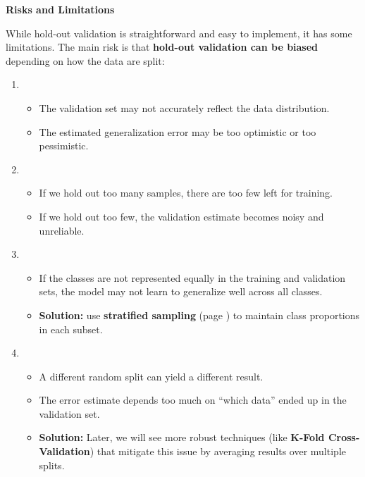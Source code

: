 \newpage

\begin{flushleft}
    \textcolor{Red2}{ \textbf{Risks and Limitations}}
\end{flushleft}
While hold-out validation is straightforward and easy to implement, it has some limitations. The main risk is that \textbf{hold-out validation can be biased} depending on how the data are split:
\begin{enumerate}
    \item {}
    \begin{itemize}
        \item The validation set may not accurately reflect the data distribution.
        \item The estimated generalization error may be too optimistic or too pessimistic.
    \end{itemize}

    \item {}
    \begin{itemize}
        \item If we hold out too many samples, there are too few left for training.
        \item If we hold out too few, the validation estimate becomes noisy and unreliable.
    \end{itemize}

    \item {}
    \begin{itemize}
        \item If the classes are not represented equally in the training and validation sets, the model may not learn to generalize well across all classes.
        \item[\textcolor{Green3}{\faIcon{check}}] \textcolor{Green3}{\textbf{Solution:}} use \textbf{stratified sampling} (page \pageref{def:stratified-sampling}) to maintain class proportions in each subset.
    \end{itemize}

    \item {}
    \begin{itemize}
        \item A different random split can yield a different result.
        \item The error estimate depends too much on ``which data'' ended up in the validation set.
        \item[\textcolor{Green3}{\faIcon{check}}] \textcolor{Green3}{\textbf{Solution:}}  Later, we will see more robust techniques (like \textbf{K-Fold Cross-Validation}) that mitigate this issue by averaging results over multiple splits.
    \end{itemize}
\end{enumerate}

